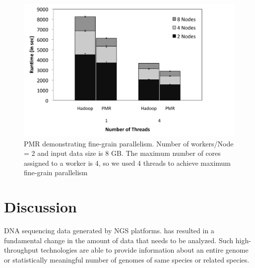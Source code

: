 \documentclass{acm_proc_article-sp}
\begin{document}
\begin{figure} 
 \centering
\includegraphics[scale=0.44]{figures/fig6_bw.pdf}
\caption{\small PMR demonstrating fine-grain parallelism.  Number of workers/Node = 2 and input data size is 8 GB. The maximum number of cores assigned to a worker is 4, so we used 4 threads to achieve maximum fine-grain parallelism }
  \label{fig:mulit-parallel} 
\end{figure}

\section{Discussion}\label{sec:discussions}


DNA sequencing data generated by NGS
platforms\cite{metzker2010,1000genome,wang2009-natrevgen,alex2009,mcpherson2009}.
has resulted in a fundamental change in the amount of data that needs
to be analyzed. Such high-throughput technologies are able to provide
information about an entire genome or statistically meaningful number
of genomes of same species or related species.

\end{document}
